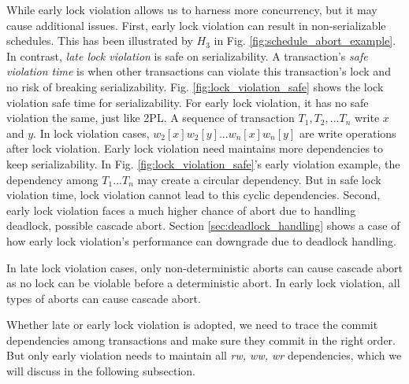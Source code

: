 \documentclass[conference]{IEEEtran}
\begin{document}
While early lock violation allows us to harness more concurrency, but it may cause additional issues. 
First, early lock violation can result in non-serializable schedules. This has been illustrated by ${H_3}$ in Fig.   \ref{fig:schedule_abort_example}.
In contrast, \emph{late lock violation} is safe on serializability. 
A transaction's \emph{safe violation time} is when other transactions can violate this transaction's lock  and no risk of breaking serializability.
Fig. \ref{fig:lock_violation_safe}
shows the lock violation safe time for serializability.
For early lock violation, it has no safe violation the same, just like 2PL.
A sequence of transaction ${T_1, T_2, ... T_n}$ write ${x}$ and ${y}$.
In lock violation cases, ${w_2[x]w_2[y]... w_{n}[x]w_{n}[y]}$ are write operations after lock violation.
Early lock violation need maintains more dependencies to keep serializability.
In Fig. \ref{fig:lock_violation_safe}'s early violation example, the dependency among ${T_1... T_n}$ may create a circular dependency.
But in safe lock violation time, lock violation cannot lead to this cyclic dependencies.
Second, early lock violation faces a much higher chance of abort due to handling deadlock,
possible cascade abort.
Section \ref{sec:deadlock_handling}
shows a case of how early lock violation's performance can downgrade due to deadlock handling.

In late lock violation cases, only non-deterministic aborts can cause cascade abort as no lock can be violable before a deterministic abort. 
In early lock violation, all types of aborts can cause cascade abort.


Whether late or early lock violation is adopted, we need to trace the commit dependencies among transactions and make sure they commit in the right order.
But only early violation needs to maintain all \emph{rw, ww, wr} dependencies, which we will discuss in the following subsection.
\end{document}
